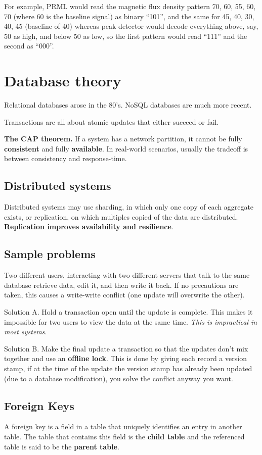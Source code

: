 \documentclass[oneside]{book} %
\theoremstyle{plain}
\begin{document}
For example, PRML would read the magnetic flux density pattern 70, 60, 55, 60,
70 (where 60 is the baseline signal) as binary ``101'', and the same for 45, 40,
30, 40, 45 (baseline of 40) whereas peak detector would decode everything
above, say, 50 as high, and below 50 as low, so the first pattern would read
``111'' and the second as ``000''.

\chapter{Database theory}
Relational databases arose in the 80's. NoSQL databases are much more recent.

Transactions are all about atomic updates that either succeed or fail.

\textbf{The CAP theorem.} If a system has a network partition, it cannot be
fully \textbf{consistent} and fully \textbf{available}. In real-world scenarios,
usually the tradeoff is between consistency and response-time.

\section{Distributed systems}
Distributed systems may use sharding, in which only one copy of each aggregate
exists, or replication, on which multiples copied of the data are distributed.
\textbf{Replication improves availability and resilience}.

\section{Sample problems}
Two different users, interacting with two different servers that talk to the
same database retrieve data, edit it, and then write it back. If no precautions
are taken, this causes a write-write conflict (one update will overwrite the
other).

Solution A. Hold a transaction open until the update is complete. This makes it
impossible for two users to view the data at the same time. \textit{This is
impractical in most systems}.

Solution B. Make the final update a transaction so that the updates don't mix
together and use an \textbf{offline lock}. This is done by giving each record a
version stamp, if at the time of the update the version stamp has already been
updated (due to a database modification), you solve the conflict anyway you
want.

\section{Foreign Keys}
A foreign key is a field in a table that uniquely identifies an entry in another
table. The table that contains this field is the \textbf{child table} and the
referenced table is said to be the \textbf{parent table}.
\end{document}
